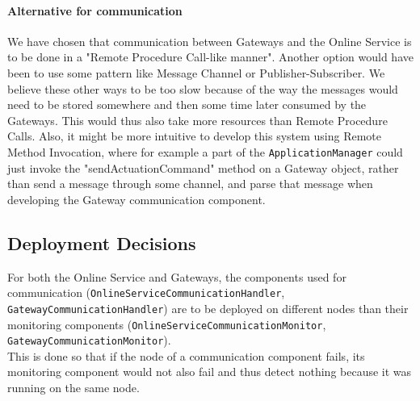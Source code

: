         \paragraph{Alternative for communication}
            We have chosen that communication between Gateways and the Online Service is to be done in a "Remote Procedure Call-like manner".
            Another option would have been to use some pattern like Message Channel or Publisher-Subscriber. We believe these other ways
            to be too slow because of the way the messages would need to be stored somewhere and then some time later consumed by the Gateways. This would thus
            also take more resources than Remote Procedure Calls. Also, it might be more intuitive to develop this system using Remote Method
            Invocation, where for example a part of the \texttt{ApplicationManager} could just invoke the "sendActuationCommand" method on a Gateway object,
            rather than send a message through some channel, and parse that message when developing the Gateway communication component.

    \subsection*{Deployment Decisions}
        For both the Online Service and Gateways, the components used for communication
        (\texttt{OnlineServiceCommunicationHandler}, \texttt{GatewayCommunicationHandler}) are to be deployed on different nodes than
        their monitoring components (\texttt{OnlineServiceCommunicationMonitor}, \texttt{GatewayCommunicationMonitor}). \\
        This is done so that if the node of a communication component fails,
        its monitoring component would not also fail and thus detect nothing because it was running on the same node.
